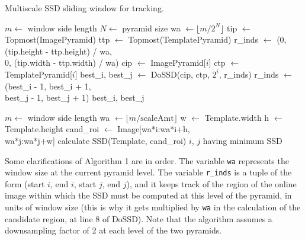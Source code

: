 \documentclass[10pt,twocolumn,letterpaper]{article}
\begin{document}
\begin{algorithm}
 \caption{Multiscale SSD sliding window for tracking.}
 \begin{algorithmic}[1]
  \State $m \leftarrow$ window side length
  \State $N \leftarrow$ pyramid size
  \State wa $\leftarrow \lfloor m / 2^{N} \rfloor$
  \State tip $\leftarrow$ Topmost(ImagePyramid)
  \State ttp $\leftarrow$ Topmost(TemplatePyramid)
  \State r\_inds $\leftarrow$ (0, (tip.height - ttp.height) / wa,\\\hspace{57pt}0, (tip.width - ttp.width) / wa)
     \State cip $\leftarrow$ ImagePyramid[$i$]
     \State ctp $\leftarrow$ TemplatePyramid[$i$]
     \State best\_i, best\_j $\leftarrow$ DoSSD(cip, ctp, $2^{i}$, r\_inds)
     \State r\_inds $\leftarrow$ (best\_i - 1, best\_i + 1,\\\hspace{73pt}best\_j - 1, best\_j + 1)
  \EndFor
  \State \Return best\_i, best\_j
  \EndProcedure
 \end{algorithmic}
  \begin{algorithmic}[1]
  \State $m \leftarrow$ window side length
  \State wa $\leftarrow \lfloor m / \text{scaleAmt} \rfloor$
  \State w $\leftarrow$ Template.width
  \State h $\leftarrow$ Template.height
    \State cand\_roi $\leftarrow$ Image[wa*i:wa*i+h,\\\hspace{122pt}wa*j:wa*j+w]
    \State calculate SSD(Template, cand\_roi)
    \EndFor
  \EndFor
  \State \Return $i$, $j$ having minimum SSD
  \EndProcedure
 \end{algorithmic}
\end{algorithm}

Some clarifications of Algorithm 1 are in order. The variable \texttt{wa}
represents the window size at the current pyramid level. The variable \texttt{r\_inds}
is a tuple of the form (start $i$, end $i$, start $j$, end $j$), and it keeps
track of the region of the online image within which the SSD must be computed
at this level of the pyramid, in units of window size (this is why it gets
multiplied by \texttt{wa} in the calculation of the candidate region, at line 8 of
DoSSD). Note that the algorithm assumes a downsampling factor of 2 at each level
of the two pyramids.
\end{document}
